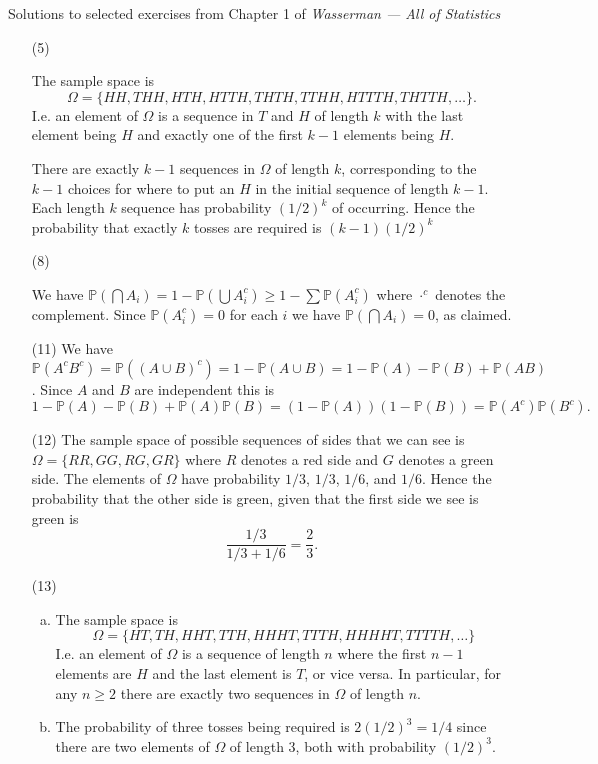 \documentclass[10pt]{article}
\renewcommand{\P}{\mathbb{P}}
\begin{document}
\noindent \large{Solutions to selected exercises from Chapter 1 of
\emph{Wasserman --- All of Statistics}}

\begin{enumerate}
\item[(5)]

The sample space is
\[\Omega = \{HH, THH, HTH, HTTH, THTH, TTHH, HTTTH, THTTH, \ldots\}.\]
I.e. an element of $\Omega$ is a sequence in $T$ and $H$
of length $k$ with the last element
being $H$ and exactly one of the first $k-1$ elements being $H$.

There are exactly $k-1$ sequences in $\Omega$ of length $k$, corresponding
to the $k-1$ choices for where to put an $H$ in the initial sequence of
length $k-1$. Each length $k$ sequence has probability $(1/2)^k$ of occurring.
Hence the probability that exactly $k$ tosses are required is $(k-1)(1/2)^k$

\item[(8)]

We have $\P(\bigcap A_i) = 1 -\P(\bigcup A_i^c) \geq 1 - \sum \P(A_i^c)$
where $\cdot^c$ denotes the complement. Since $\P(A_i^c)=0$ for each $i$
we have $\P(\bigcap A_i)=0$, as claimed.

\item[(11)]
We have $\P(A^cB^c)=\P((A\cup B)^c)=1-\P(A\cup B)=1-\P(A)-\P(B)+\P(AB)$.
Since $A$ and $B$ are independent this is
\[
1-\P(A)-\P(B)+\P(A)\P(B)=(1-\P(A))(1-\P(B)) = \P(A^c)\P(B^c).
\]


\item[(12)]
The sample space of possible sequences of sides that we can see is
$\Omega = \{RR, GG, RG, GR\}$ where $R$ denotes a red side and $G$ denotes
a green side. The elements of $\Omega$ have probability $1/3$, $1/3$,
$1/6$, and $1/6$. Hence the probability that the other side is green, given
that the first side we see is green is
\[
\frac{1/3}{1/3+1/6} = \frac{2}{3}.
\]

\item[(13)]
\begin{enumerate}[(a)]
\item The sample space is
\[
\Omega = \{HT, TH, HHT, TTH, HHHT, TTTH, HHHHT, TTTTH, \ldots\}
\]
I.e. an element of $\Omega$ is a sequence of length $n$ where the first
$n-1$ elements are $H$ and the last element is $T$, or vice versa.
In particular, for any $n\geq 2$ there are exactly two sequences in $\Omega$
of length $n$.

\item The probability of three tosses being required is $2(1/2)^3=1/4$ since
there are two elements of $\Omega$ of length $3$, both with probability
$(1/2)^3$.
\end{enumerate}


\end{enumerate}
\end{document}
